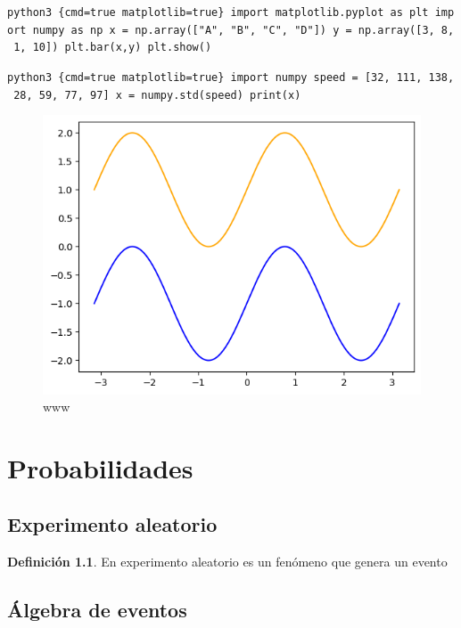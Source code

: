 \documentclass[10pt,]{krantz}
\theoremstyle{definition}
\newtheorem{definition}{Definición}[chapter]
\theoremstyle{definition}
\theoremstyle{definition}
\theoremstyle{definition}
\theoremstyle{remark}
\begin{document}
\texttt{python3\ \{cmd=true\ matplotlib=true\}\ import\ matplotlib.pyplot\ as\ plt\ import\ numpy\ as\ np\ x\ =\ np.array({[}"A",\ "B",\ "C",\ "D"{]})\ y\ =\ np.array({[}3,\ 8,\ 1,\ 10{]})\ plt.bar(x,y)\ plt.show()}

\texttt{python3\ \{cmd=true\ matplotlib=true\}\ import\ numpy\ speed\ =\ {[}32,\ 111,\ 138,\ 28,\ 59,\ 77,\ 97{]}\ x\ =\ numpy.std(speed)\ print(x)}

\begin{figure}
\centering
\includegraphics{foo.png}
\caption{www}
\end{figure}

\hypertarget{part-probabilidades}{%
\part{Probabilidades}\label{part-probabilidades}}

\hypertarget{experimento-aleatorio}{%
\chapter{Experimento aleatorio}\label{experimento-aleatorio}}

\begin{definition}
\protect\hypertarget{def:www}{}\label{def:www}En experimento aleatorio es un fenómeno que genera un evento
\end{definition}

\hypertarget{uxe1lgebra-de-eventos}{%
\chapter{Álgebra de eventos}\label{uxe1lgebra-de-eventos}}
\end{document}

